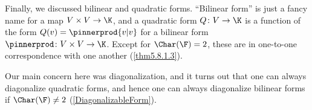 Finally, we discussed bilinear and quadratic forms.  ``Bilinear form'' is just a fancy name for a map $V\times V\rightarrow \K$, and a quadratic form $Q\colon V\rightarrow \K$ is a function of the form $Q(v)=\pinnerprod{v|v}$ for a bilinear form $\pinnerprod \colon V\times V\rightarrow \K$.  Except for $\Char (\F )=2$, these are in one-to-one correspondence with one another (\cref{thm5.8.1.3}).

Our main concern here was diagonalization, and it turns out that one can always diagonalize quadratic forms, and hence one can always diagonalize bilinear forms if $\Char (\F )\neq 2$ (\cref{DiagonalizableForm}).